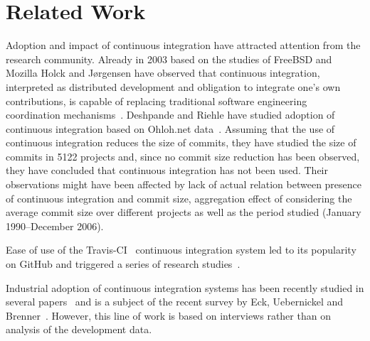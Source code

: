 \section{Related Work}
\label{sec:rw}
Adoption and impact of continuous integration have attracted  attention from the research community. Already in 2003 based on the studies of FreeBSD and Mozilla Holck and J{\o}rgensen have observed that continuous integration, interpreted as distributed development and obligation to integrate one's own contributions, is capable of replacing traditional software engineering coordination mechanisms~\cite{HolckJ03}.  
Deshpande and Riehle have studied adoption of continuous integration based on Ohloh.net data~\cite{Deshpande2008}. Assuming that the use of continuous integration reduces the size of commits, they have studied the size of commits in 5122 projects and, since no commit size reduction has been observed, they have concluded that continuous integration has not been used. Their observations might have been affected by lack of actual relation between presence of continuous integration and commit size, aggregation effect of considering the average commit size over different projects as well as the period studied (January 1990--December 2006). 

Ease of use of the Travis-CI~\cite{TravisCI} continuous integration system led to its popularity on GitHub and triggered a series of research studies~\cite{era14,VasilescuYWDF15,yue2015wait,BellerGZ16,Hilton2016,Yu2016}.

Industrial adoption of continuous integration systems has been recently studied in several papers~\cite{Leppanen2015,Laukkanen2015Agile,Debbiche2014,Stahl2014ICSEComp,Stahl2014JSS} and is a subject of the recent survey by Eck, Uebernickel and Brenner~\cite{EckUB14}. However, this line of work is based on interviews rather than on analysis of the development data.

